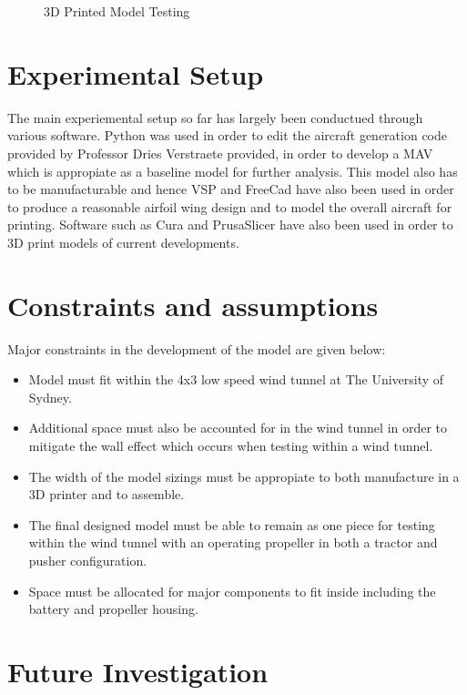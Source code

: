 \begin{figure}[h!]
    \centering
    \caption{3D Printed Model Testing}
    \label{fig:head}
\end{figure}

\section{Experimental Setup}
\label{sec:Experimental Setup}
The main experiemental setup so far has largely been conductued through various software. Python was used in order to edit the aircraft generation code provided by Professor Dries Verstraete provided, in order to develop a MAV which is appropiate as a baseline model for further analysis. This model also has to be manufacturable and hence VSP and FreeCad have also been used in order to produce a reasonable airfoil wing design and to model the overall aircraft for printing. Software such as Cura and PrusaSlicer have also been used in order to 3D print models of current developments. 


\section{Constraints and assumptions}
\label{sec: Constraints and assumptions}
Major constraints in the development of the model are given below: 

\begin{itemize}
    \item Model must fit within the 4x3 low speed wind tunnel at The University of Sydney.
    \item Additional space must also be accounted for in the wind tunnel in order to mitigate the wall effect which occurs when testing within a wind tunnel.
    \item The width of the model sizings must be appropiate to both manufacture in a 3D printer and to assemble.
    \item The final designed model must be able to remain as one piece for testing within the wind tunnel with an operating propeller in both a tractor and pusher configuration.
    \item Space must be allocated for major components to fit inside including the battery and propeller housing.
\end{itemize}





\section{Future Investigation}
\label{sec: Future Investigation}

